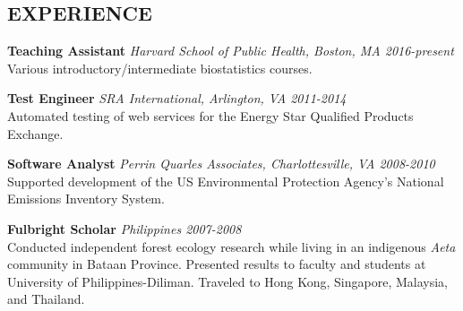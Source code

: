 \documentclass[line, margin]{res}
\begin{document}
\begin{resume}
\section{EXPERIENCE}
\textbf{Teaching Assistant} \textit{Harvard School of Public Health, Boston, MA \hfill 2016-present} \\
Various introductory/intermediate biostatistics courses.

\textbf{Test Engineer} \textit{SRA International, Arlington, VA \hfill 2011-2014} \\
Automated testing of web services for the Energy Star Qualified Products Exchange.

\textbf{Software Analyst} \textit{Perrin Quarles Associates, Charlottesville, VA \hfill 2008-2010} \\
Supported development of the US Environmental Protection Agency's National Emissions Inventory System.

\textbf{Fulbright Scholar} \textit{Philippines \hfill 2007-2008} \\
Conducted independent forest ecology research while living in an indigenous \textit{Aeta} community in Bataan Province.  Presented results to faculty and students at University of Philippines-Diliman.  Traveled to Hong Kong, Singapore, Malaysia, and Thailand.


\fancyfoot[C]{\thepage} %


\end{resume}
\end{document}
